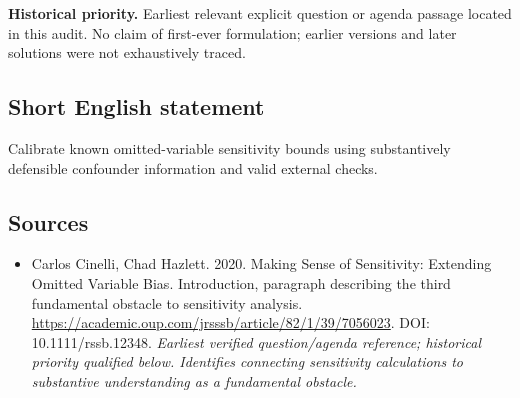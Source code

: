 \documentclass[11pt]{article}
\begin{document}
\par\textbf{Historical priority.} Earliest relevant explicit question or agenda passage located in this audit. No claim of first-ever formulation; earlier versions and later solutions were not exhaustively traced.

\subsection{Short English statement}
Calibrate known omitted-variable sensitivity bounds using substantively defensible confounder information and valid external checks.

\subsection{Sources}
\begin{itemize}\raggedright
\item[\textnormal{[S1]}]\hypertarget{source:30007704:1}{} Carlos Cinelli, Chad Hazlett. 2020. Making Sense of Sensitivity: Extending Omitted Variable Bias. Introduction, paragraph describing the third fundamental obstacle to sensitivity analysis.
\url{https://academic.oup.com/jrsssb/article/82/1/39/7056023}.
DOI: 10.1111/rssb.12348.
{\small\textit{Earliest verified question/agenda reference; historical priority qualified below. Identifies connecting sensitivity calculations to substantive understanding as a fundamental obstacle.}}
\end{itemize}
\end{document}
